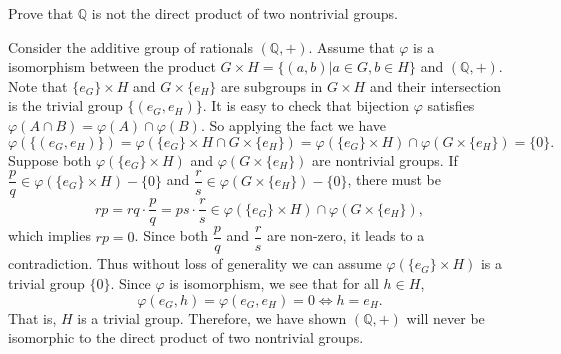 \documentclass[12pt,letterpaper,boxed]{hmcpset}
\begin{document}
\begin{problem}[3.5]	
	Prove that $\mathbb{Q}$ is not the direct product of two nontrivial groups.
\end{problem}
\begin{solution}
    Consider the additive group of rationals $(\mathbb{Q},+)$. Assume that $\varphi$ is a isomorphism between the product $G\times H=\{(a,b)|a\in G,b\in H\}$ and $(\mathbb{Q},+)$. Note that $\{e_G\}\times H$ and $G\times \{e_H\}$ are subgroups in $G\times H$ and their intersection is the trivial group $\{(e_G,e_H)\}$. It is easy to check that bijection $\varphi$ satisfies $\varphi(A\cap B)=\varphi(A)\cap\varphi (B)$. So applying the fact we have
    \[
    \varphi(\{(e_G,e_H)\})=\varphi(\{e_G\}\times H\cap G\times \{e_H\})=\varphi(\{e_G\}\times H)\cap \varphi(G\times \{e_H\})=\{0\}.
    \] 
    Suppose both $\varphi(\{e_G\}\times H)$ and $\varphi(G\times \{e_H\})$ are nontrivial groups. If $\dfrac{p}{q}\in \varphi(\{e_G\}\times H)-\{0\}$ and $\dfrac{r}{s}\in \varphi(G\times \{e_H\})-\{0\}$, there must be 
    \[
    rp=rq\cdot\dfrac{p}{q}=ps\cdot\dfrac{r}{s}\in \varphi(\{e_G\}\times H)\cap\varphi(G\times \{e_H\}),
    \]
    which implies $rp=0$. Since both $\dfrac{p}{q}$ and $\dfrac{r}{s}$ are non-zero, it leads to a contradiction. Thus without loss of generality we can assume $\varphi(\{e_G\}\times H)$ is a trivial group $\{0\}$. 
    Since $\varphi$ is isomorphism, we see that for all $h\in H$,
    \[
    \varphi(e_G,h)=\varphi(e_G,e_H)=0\iff h=e_H.
    \]
    That is, $H$ is a trivial group. Therefore, we have shown $(\mathbb{Q},+)$ will never be isomorphic to the direct product of two nontrivial groups.
\end{solution}
\end{document}
